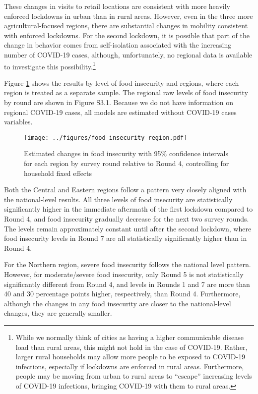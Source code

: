 \documentclass{wber}
\begin{document}
These changes in visits to retail locations are consistent with more
heavily enforced lockdowns in urban than in rural areas. However, even
in the three more agricultural-focused regions, there are substantial
changes in mobility consistent with enforced lockdowns. For the second
lockdown, it is possible that part of the change in behavior comes from
self-isolation associated with the increasing number of COVID-19 cases,
although, unfortunately, no regional data is available to investigate
this possibility.\footnote{While we normally think of cities as having a
  higher communicable disease load than rural areas, this might not hold
  in the case of COVID-19. Rather, larger rural households may allow
  more people to be exposed to COVID-19 infections, especially if
  lockdowns are enforced in rural areas. Furthermore, people may be
  moving from urban to rural areas to ``escape'' increasing levels of
  COVID-19 infections, bringing COVID-19 with them to rural areas.}

Figure \ref{fig:food_insecurity_region} shows the results by level of food
insecurity and regions, where each region is treated as a separate
sample. The regional raw levels of food insecurity by round are shown in
Figure S3.1. Because we do not have information on regional COVID-19 cases, 
all models are estimated without COVID-19 cases variables.

\begin{figure}
\centering
\texttt{[image: ../figures/food\_insecurity\_region.pdf]}
\caption{Estimated changes in food insecurity with 95\% confidence
intervals for each region by survey round relative to Round 4,
controlling for household fixed
effects}\label{fig:food_insecurity_region}
\end{figure}

Both the Central and Eastern regions follow a pattern very closely
aligned with the national-level results. All three levels of food
insecurity are statistically significantly higher in the immediate
aftermath of the first lockdown compared to Round 4, and food insecurity
gradually decrease for the next two survey rounds. The levels remain
approximately constant until after the second lockdown, where food
insecurity levels in Round 7 are all statistically significantly higher
than in Round 4.

For the Northern region, severe food insecurity follows the national
level pattern. However, for moderate/severe food insecurity, only Round
5 is not statistically significantly different from Round 4, and levels
in Rounds 1 and 7 are more than 40 and 30 percentage points higher,
respectively, than Round 4. Furthermore, although the changes in any
food insecurity are closer to the national-level changes, they are
generally smaller.
\end{document}
